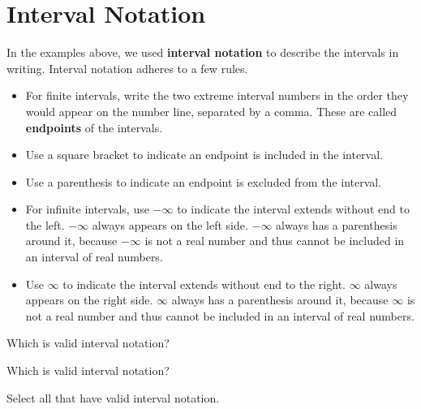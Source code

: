 \documentclass{ximera}
\begin{document}
\section{Interval Notation}

In the examples above, we used \textbf{interval notation} to describe the intervals in writing. Interval notation adheres to a few rules.

\begin{itemize}
\item For finite intervals, write the two extreme interval numbers in the order they would appear on the number line, separated by a comma.  These are called \textbf{endpoints} of the intervals.
\item Use a square bracket to indicate an endpoint is included in the interval.
\item Use a parenthesis to indicate an endpoint is excluded from the interval.
\item For infinite intervals, use $-\infty$ to indicate the interval extends without end to the left. $-\infty$ always appears on the left side. $-\infty$ always has a parenthesis around it, because $-\infty$ is not a real number and thus cannot be included in an interval of real numbers.
\item Use $\infty$ to indicate the interval extends without end to the right. $\infty$ always appears on the right side. $\infty$ always has a parenthesis around it, because $\infty$ is not a real number and thus cannot be included in an interval of real numbers. 
\end{itemize}


\begin{question}
Which is valid interval notation?
	\begin{multipleChoice}
	\choice {$[3, -2)$}
	\choice [correct]{$[-2, 3)$}
	\end{multipleChoice}
\end{question}



\begin{question}
Which is valid interval notation?
	\begin{multipleChoice}
	\choice {$[1, \infty]$}
	\choice [correct]{$[1, \infty)$}
	\end{multipleChoice}
\end{question}



\begin{question}
Select all that have valid interval notation.
	\begin{selectAll}
	\choice {$[-3, -5]$}
	\choice [correct]{$[1, 8)$}
	\choice [correct]{$(-\infty, -4]$}
	\choice {$[-\infty, 7)$}
	\choice [correct]{$(-1, 2]$}
	\choice {$[6, 2]$}
	\end{selectAll}
\end{question}
\end{document}
